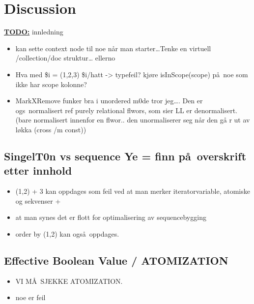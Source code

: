 \chapter{Discussion}
\label{chapter:discussion}

\textbf{\underline{\LARGE TODO:}} innledning

\begin{itemize}
  
  \item kan sette context node til noe n\aa r man starter\ldots Tenke en virtuell /collection/doc struktur\ldots
  ellerno
	\item Hva med \$i = (1,2,3) \$i/hatt -> typefeil? kj\o re isInScope(scope) p\aa~noe som ikke har scope kolonne?
	\item MarkXRemove funker bra i unordered m0de tror jeg\ldots. Den er ogs\a~normalisert ref purely relational
	flwors, som sier LL er denormalisert. (bare normalisert innenfor en flwor.. den unormaliserer seg n\aa r den g\aa
	r ut av l\o kka (cross /m const))
\end{itemize}

\section{SingelT0n vs sequence Ye = finn p\aa~overskrift etter innhold}
\label{sect:disc:singelton}
\begin{itemize}
   \item (1,2) + 3 kan oppdages som feil ved at man merker iteratorvariable, atomiske og sekvenser + 
   \item at man synes det er flott for optimalisering av sequencebygging 
   \item order by (1,2) kan ogs\aa~oppdages. 
\end{itemize}


\section{Effective Boolean Value / ATOMIZATION}
\begin{itemize}
\item VI M\AA~SJEKKE ATOMIZATION.
\item noe er feil
\end{itemize}

